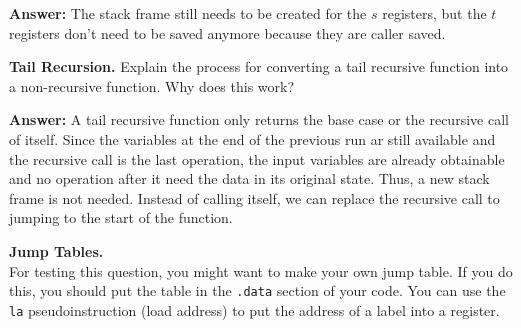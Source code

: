 \documentclass{exam}
\begin{document}
\begin{questions}

\textbf{Answer:}
The stack frame still needs to be created for the $s$ registers, but the $t$ registers don't need to be saved anymore because they are caller saved.

\question[5]
\textbf{Tail Recursion.}
Explain the process for converting a tail recursive function into a non-recursive function. 
Why does this work?

\textbf{Answer:}
A tail recursive function only returns the base case or the recursive call of itself. Since the variables at the end of the previous run ar still available and the recursive call is the last operation, the input variables are already obtainable and no operation after it need the data in its original state. Thus, a new stack frame is not needed. Instead of calling itself, we can replace the recursive call to jumping to the start of the function. 

\question[10]
\textbf{Jump Tables.} \\
For testing this question, you might want to make your own jump table. 
If you do this, you should put the table in the \texttt{.data} section of your code. 
You can use the \texttt{la} pseudoinstruction (load address) to put the address of a label into a register. 
\end{questions}
\end{document}
